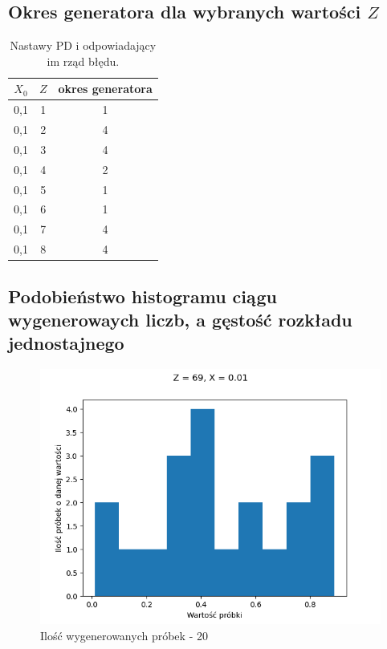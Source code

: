\documentclass[12pt,a4paper]{article}
\begin{document}
  \subsection{Okres generatora dla wybranych wartości $Z$}

  \begin{table}[h!]
    \centering
    \begin{tabular}{ c | c | c }
      $X_0$ & $Z$ & okres generatora  \\ 
      \hline
      0,1 & 1 & 1  \\  
      0,1 & 2 & 4  \\  
      0,1 & 3 & 4  \\  
      0,1 & 4 & 2  \\  
      0,1 & 5 & 1  \\
      0,1 & 6 & 1  \\
      0,1 & 7 & 4  \\
      0,1 & 8 & 4 
    \end{tabular}
    \caption{Nastawy PD i odpowiadający im rząd błędu.}
    \label{table:1}
  \end{table}

  \subsection{Podobieństwo histogramu ciągu wygenerowaych liczb, a gęstość rozkładu jednostajnego}


  \begin{figure}[H]
    \centering
    \includegraphics[height=0.25\textheight]{figures/Figure_10.png}
    \caption{Ilość wygenerowanych próbek - 20}
    \label{fig:10}
  \end{figure}
\end{document}
